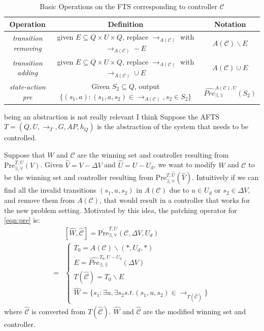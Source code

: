 \begin{table}
	\centering
	\caption{Basic Operations on the FTS corresponding to controller $ \mathcal{C} $}
	\begin{tabular}{ccc}
		\hline
		Operation & Definition & Notation\\
		\hline
		\emph{transition removing} & given $ E\subseteq Q\times U\times Q $, replace $ \rightarrow_{A(\mathcal{C})} $ with $\rightarrow_{A(\mathcal{C})} - E$ & $ A(\mathcal{C})\backslash E $\\
		\emph{transition adding} & given $ E\subseteq Q\times U\times Q $, replace $ \rightarrow_{A(\mathcal{C})} $ with $ \rightarrow_{A(\mathcal{C})}\cup E $ & $ A(\mathcal{C})\cup E $\\
		\emph{state-action pre} &  Given $ S_2\subseteq Q $, output $ \{(s_1,a): (s_1,a,s_2)\in \rightarrow_{A(\mathcal{C})}, s_2\in S_2\} $ & $ \widehat{Pre}^{A(\mathcal{C}),U}_{\exists,\exists}(S_2) $\\
		\hline
	\end{tabular}
	\label{tab:oper}
\end{table}

{\color{red}being an abstraction is not really relevant I think} 
Suppose the AFTS $ T = (Q,U,\rightarrow_T, G, AP, h_Q) $ is the abstraction of the system that needs to be controlled. 

Suppose that  $ W $ and $ \mathcal{C} $ are the winning set and controller resulting from $ \text{Pre}_{\exists,\forall}^{T, U}(V) $. Given $ \widehat{V}= V-\Delta V $ and $ \widehat{U} = U-U_d $, we want to modify $ W $ and $ \mathcal{C} $ to be the winning set and controller resulting from $ \text{Pre}_{\exists,\forall}^{T,\widehat{U}}(\widehat{V}) $. Intuitively if we can find all the invalid transitions $ (s_1,u,s_2) $ in $ A(\mathcal{C}) $ due to $ u\in U_d $ or $ s_2\in\Delta V $, and remove them from $ A(\mathcal{C}) $, that would result in a controller that works for the new problem setting. Motivated by this idea, the patching operator for \eqref{eqn:pre} is:
{\small
\begin{align}
&[\widehat{W},\widehat{\mathcal{C}}]=\overline{\text{Pre}}_{\exists,\forall}^{T, U}(\mathcal{C},\Delta V,U_d)\nonumber\\
=&\begin{cases} 
T_{0} = A(\mathcal{C})\backslash (*,U_d,*)\\
E =  \widehat{Pre}^{T_0,U-U_d}_{\exists,\exists}(\Delta V)\\
T(\widehat{\mathcal{C}}) = T_{0}\backslash E\\
\widehat{W} = \{s_1: \exists u, \exists s_2 s.t. (s_1,u, s_2)\in \rightarrow_{T(\widehat{\mathcal{C}})} \}
\end{cases}\label{patch-pre}
\end{align}}
where $ \widehat{\mathcal{C}} $ is converted from $ T(\widehat{\mathcal{C}}) $. $ \widehat{W} $ and $ \widehat{\mathcal{C}} $ are the modified winning set and controller.

